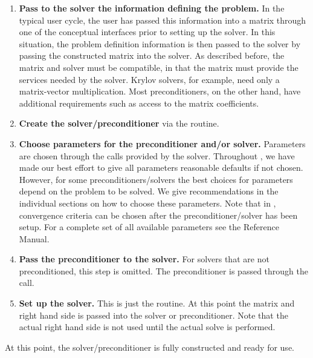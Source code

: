 \begin{enumerate}

\item
{\bf Pass to the solver the information defining the problem.} In the
typical user cycle, the user has passed this information into a matrix
through one of the conceptual interfaces prior to setting up the
solver. In this situation, the problem definition information is then
passed to the solver by passing the constructed matrix into the
solver. As described before, the matrix and solver must be compatible,
in that the matrix must provide the services needed by the
solver. Krylov solvers, for example, need only a matrix-vector
multiplication.  Most preconditioners, on the other hand, have
additional requirements such as access to the matrix coefficients.

\item
{\bf Create the solver/preconditioner} via the  routine.

\item
{\bf Choose parameters for the preconditioner and/or solver.}
Parameters are chosen through the  calls provided by the
solver.  Throughout \hypre{}, we have made our best effort to
give all parameters reasonable defaults if not chosen.  However, 
for some preconditioners/solvers the best choices for parameters
depend on the problem to be solved. We give recommendations in the
individual sections on how to choose these parameters.
Note that in \hypre{}, convergence
criteria can be chosen after the preconditioner/solver has been setup.
For a complete set of all available parameters see the Reference Manual.

\item
{\bf Pass the preconditioner to the solver.} For solvers that are not
preconditioned, this step is omitted.  The preconditioner is passed
through the  call.

\item
{\bf Set up the solver.} This is just the  routine.
At this point the matrix and right hand side is passed into the solver
or preconditioner. Note that the actual right hand side is not used
until the actual solve is performed.

\end{enumerate}

At this point, the solver/preconditioner is fully constructed and
ready for use.



